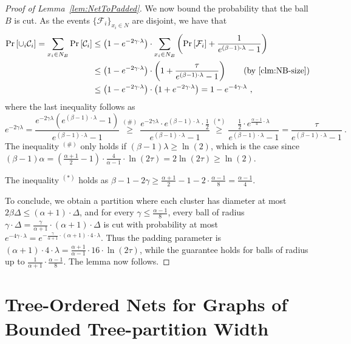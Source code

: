 \documentclass{article}
\def\cF{\ensuremath{\mathcal{F}}}
\begin{document}
\begin{proof}[Proof of Lemma~\ref{lem:NetToPadded}]
	We now bound the probability that the ball $B$ is cut. As the events $\{\cF_i\}_{x_i\in N}$ are disjoint, we have that
	\begin{align*}
		\Pr\left[\cup_{i}\mathcal{C}_{i}\right]=\sum_{x_{i}\in N_{B}}\Pr\left[\mathcal{C}_{i}\right] & \le\left(1-e^{-2\gamma\cdot\lambda}\right)\cdot\sum_{x_{i}\in N_{B}}\left(\Pr\left[\mathcal{F}_{i}\right]+\frac{1}{e^{(\beta-1)\cdot\lambda}-1}\right)\\
		& \le\left(1-e^{-2\gamma\cdot\lambda}\right)\cdot\left(1+\frac{\tau}{e^{(\beta-1)\cdot\lambda}-1}\right)\qquad\mbox{(by \Cref{clm:NB-size})}\\
		& \le\left(1-e^{-2\gamma\cdot\lambda}\right)\cdot\left(1+e^{-2\gamma\cdot\lambda}\right)=1-e^{-4\gamma\cdot\lambda}~,
	\end{align*}
	where the last inequality follows as
	\[
	e^{-2\gamma\lambda}=\frac{e^{-2\gamma\lambda}\left(e^{(\beta-1)\cdot\lambda}-1\right)}{e^{(\beta-1)\cdot\lambda}-1}\overset{(\#)}\ge\frac{e^{-2\gamma\lambda}\cdot e^{(\beta-1)\cdot\lambda}\cdot\frac{1}{2}}{e^{(\beta-1)\cdot\lambda}-1}\overset{(*)}{\ge}\frac{\frac{1}{2}\cdot e^{\frac{\alpha-1}{4}\cdot\lambda}}{e^{(\beta-1)\cdot\lambda}-1}=\frac{\tau}{e^{(\beta-1)\cdot\lambda}-1}~.
	\]
    The inequality $^{(\#)}$ only holds if $(\beta - 1)\lambda \geq \ln(2)$, which is the case since $(\beta - 1)\alpha = \left( \frac{\alpha + 1}{2} - 1 \right) \cdot \frac{4}{\alpha - 1} \cdot \ln(2\tau) = 2 \ln(2\tau) \geq \ln(2)$.
    
	The inequality $^{(*)}$ holds as $\beta-1-2\gamma\ge\frac{\alpha+1}{2}-1-2\cdot\frac{\alpha-1}{8}=\frac{\alpha-1}{4}$.
	
	
	
	To conclude, we obtain a partition where each cluster has diameter at most $2\beta\Delta\le(\alpha+1)\cdot\Delta$, and for every $\gamma\le\frac{\alpha-1}{8}$, every ball of radius
	$\gamma\cdot\Delta=\frac{\gamma}{\alpha+1}\cdot(\alpha+1)\cdot\Delta$
	is cut with probability at most $e^{-4\gamma\cdot\lambda}=e^{-\frac{\gamma}{\alpha+1}\cdot(\alpha+1)\cdot4\cdot\lambda}$.
	Thus the padding parameter is $(\alpha+1)\cdot4\cdot\lambda=\frac{\alpha+1}{\alpha-1}\cdot16\cdot\ln(2\tau)$,
	while the guarantee holds for balls of radius up to $\frac{1}{\alpha+1}\cdot\frac{\alpha-1}{8}$.
	The lemma now follows.
\end{proof}




\section{Tree-Ordered Nets for Graphs of Bounded Tree-partition Width}\label{sec:treenet-tp}
\end{document}
